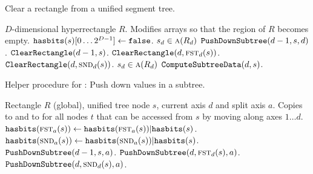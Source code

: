 \documentclass[english,gradu]{tktltiki2018}
\begin{document}
\begin{algorithm}
\caption{Clear a rectangle from a unified segment tree.}\label{alg:segurm}
\begin{algorithmic}
\Require $D$-dimensional hyperrectangle $R$.
\Ensure Modifies \hasbita{} arrays so that the region of $R$ becomes empty.
		\State \Return
	\EndIf
		\State $\texttt{hasbits}(s)[0\dots 2^{D-1}]\gets\texttt{false}$.
		\State \Return
	\EndIf
		\Comment $s_d\in\textsc{a}(R_d)$
		\State $\texttt{PushDownSubtree}(d-1,s,d)$.
	\EndIf
	\State $\texttt{ClearRectangle}(d-1,s)$.
		\State $\texttt{ClearRectangle}(d,\textsc{fst}_{d}(s))$.
		\State $\texttt{ClearRectangle}(d,\textsc{snd}_{d}(s))$.
	\EndIf
		\Comment $s_d\in\textsc{a}(R_d)$
		\State $\texttt{ComputeSubtreeData}(d,s)$.
	\EndIf
\EndProcedure
\end{algorithmic}
\end{algorithm}

\begin{algorithm}
\caption{Helper procedure for \cleardt: Push down values in a subtree.}\label{alg:segurm:pdst}
\begin{algorithmic}
\Require Rectangle $R$ (global), unified tree node $s$, current axis $d$ and split axis $a$.
\Ensure Copies  to  and to  for all nodes $t$ that can be accessed from $s$ by moving along axes $1\dots d$.
		\State $\texttt{hasbits}(\textsc{fst}_{a}(s))\gets \texttt{hasbits}(\textsc{fst}_{a}(s)) | \texttt{hasbits}(s)$.
		\State $\texttt{hasbits}(\textsc{snd}_{a}(s))\gets \texttt{hasbits}(\textsc{snd}_{a}(s)) | \texttt{hasbits}(s)$.
		\State \Return
		\State \Return
	\EndIf
	\State $\texttt{PushDownSubtree}(d-1,s,a)$.
		\State $\texttt{PushDownSubtree}(d,\textsc{fst}_{d}(s),a)$.
		\State $\texttt{PushDownSubtree}(d,\textsc{snd}_{d}(s),a)$.
	\EndIf
\EndProcedure
\end{algorithmic}
\end{algorithm}
\end{document}
